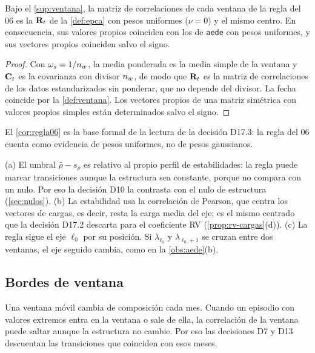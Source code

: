 \begin{corolario}\label{cor:regla06}
Bajo el \cref{sup:ventana}, la matriz de correlaciones de cada ventana de la regla del 06 es la
$\mathbf{R}_t$ de la \cref{def:epca} con pesos uniformes ($\nu=0$) y el mismo centro. En consecuencia, sus
valores propios coinciden con los de \texttt{aede} con pesos uniformes, y sus vectores propios
coinciden salvo el signo.
\end{corolario}

\begin{proof}
Con $\omega_s=1/n_{w}$, la media ponderada es la media simple de la ventana y $\mathbf{C}_t$ es la
covarianza con divisor $n_{w}$, de modo que $\mathbf{R}_t$ es la matriz de correlaciones de los datos
estandarizados sin ponderar, que no depende del divisor. La fecha coincide por la
\cref{def:ventana}. Los vectores propios de una matriz simétrica con valores propios simples están
determinados salvo el signo.
\end{proof}

El \cref{cor:regla06} es la base formal de la lectura de la decisión D17.3: la regla del 06
cuenta como evidencia de pesos uniformes, no de pesos gaussianos.

\begin{observacion}\label{obs:regla06}
(a) El umbral $\bar\rho-s_\rho$ es relativo al propio perfil de estabilidades: la regla puede
marcar transiciones aunque la estructura sea constante, porque no compara con un nulo. Por eso la
decisión D10 la contrasta con el nulo de estructura (\cref{sec:nulos}). (b) La estabilidad usa la
correlación de Pearson, que centra los vectores de cargas, es decir, resta la carga media del eje;
es el mismo centrado que la decisión D17.2 descarta para el coeficiente RV
(\cref{prop:rv-cargas}(d)). (c) La regla sigue el eje $\ell_0$ por su posición. Si
$\lambda_{\ell_0}$ y $\lambda_{\ell_0+1}$ se cruzan entre dos ventanas, el eje seguido cambia, como
en la \cref{obs:aede}(b).
\end{observacion}

\subsection{Bordes de ventana}
\label{sec:bordes}

Una ventana móvil cambia de composición cada mes. Cuando un episodio con valores extremos entra en
la ventana o sale de ella, la correlación de la ventana puede saltar aunque la estructura no
cambie. Por eso las decisiones D7 y D13 descuentan las transiciones que coinciden con esos meses.

